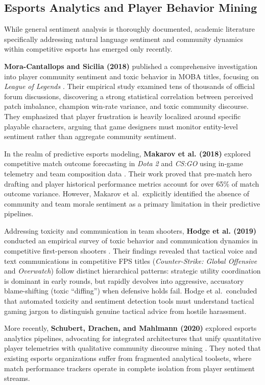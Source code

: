 \subsection{Esports Analytics and Player Behavior Mining}

While general sentiment analysis is thoroughly documented, academic literature specifically addressing natural language sentiment and community dynamics within competitive esports has emerged only recently.

\textbf{Mora-Cantallops and Sicilia (2018)} published a comprehensive investigation into player community sentiment and toxic behavior in MOBA titles, focusing on \textit{League of Legends} \cite{mora2018exploring}. Their empirical study examined tens of thousands of official forum discussions, discovering a strong statistical correlation between perceived patch imbalance, champion win-rate variance, and toxic community discourse. They emphasized that player frustration is heavily localized around specific playable characters, arguing that game designers must monitor entity-level sentiment rather than aggregate community sentiment.

In the realm of predictive esports modeling, \textbf{Makarov et al. (2018)} explored competitive match outcome forecasting in \textit{Dota 2} and \textit{CS:GO} using in-game telemetry and team composition data \cite{makarov2018predicting}. Their work proved that pre-match hero drafting and player historical performance metrics account for over 65\% of match outcome variance. However, Makarov et al.\ explicitly identified the absence of community and team morale sentiment as a primary limitation in their predictive pipelines.

Addressing toxicity and communication in team shooters, \textbf{Hodge et al. (2019)} conducted an empirical survey of toxic behavior and communication dynamics in competitive first-person shooters \cite{hodge2019toxicity}. Their findings revealed that tactical voice and text communications in competitive FPS titles (\textit{Counter-Strike: Global Offensive} and \textit{Overwatch}) follow distinct hierarchical patterns: strategic utility coordination is dominant in early rounds, but rapidly devolves into aggressive, accusatory blame-shifting (toxic ``diffing'') when defensive holds fail. Hodge et al.\ concluded that automated toxicity and sentiment detection tools must understand tactical gaming jargon to distinguish genuine tactical advice from hostile harassment.

More recently, \textbf{Schubert, Drachen, and Mahlmann (2020)} explored esports analytics pipelines, advocating for integrated architectures that unify quantitative player telemetries with qualitative community discourse mining \cite{schubert2020esports}. They noted that existing esports organizations suffer from fragmented analytical toolsets, where match performance trackers operate in complete isolation from player sentiment streams.

